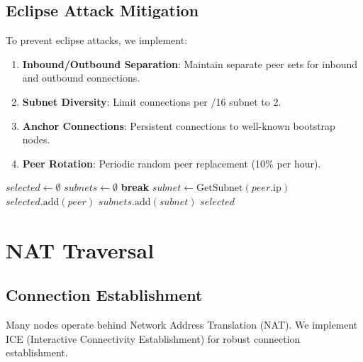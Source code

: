 \documentclass[11pt,a4paper]{article}
\begin{document}
\subsection{Eclipse Attack Mitigation}

To prevent eclipse attacks, we implement:

\begin{enumerate}
    \item \textbf{Inbound/Outbound Separation}: Maintain separate peer sets for inbound and outbound connections.
    \item \textbf{Subnet Diversity}: Limit connections per /16 subnet to 2.
    \item \textbf{Anchor Connections}: Persistent connections to well-known bootstrap nodes.
    \item \textbf{Peer Rotation}: Periodic random peer replacement (10\% per hour).
\end{enumerate}

\begin{algorithm}
\caption{Peer Selection with Eclipse Resistance}
\begin{algorithmic}[1]
    \State $selected \gets \emptyset$
    \State $subnets \gets \emptyset$
            \textbf{break}
        \EndIf
        \State $subnet \gets \text{GetSubnet}(peer.\text{ip})$
            \State $selected.\text{add}(peer)$
            \State $subnets.\text{add}(subnet)$
        \EndIf
    \EndFor
    \Return $selected$
\EndProcedure
\end{algorithmic}
\end{algorithm}

\section{NAT Traversal}

\subsection{Connection Establishment}

Many nodes operate behind Network Address Translation (NAT). We implement ICE (Interactive Connectivity Establishment) for robust connection establishment.
\end{document}
